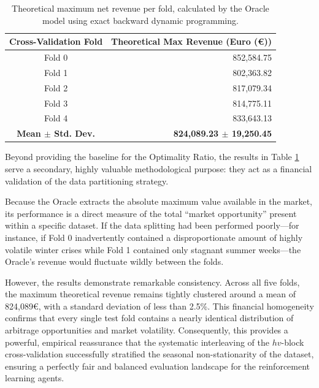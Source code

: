                 \begin{table}[h]
                    \centering
                    \renewcommand{\arraystretch}{1.2} 
                    \begin{tabular}{c r}
                        \hline
                        \textbf{Cross-Validation Fold} & \textbf{Theoretical Max Revenue (Euro (€))} \\
                        \hline
                        Fold 0 & 852,584.75 \\
                        Fold 1 & 802,363.82 \\
                        Fold 2 & 817,079.34 \\
                        Fold 3 & 814,775.11 \\
                        Fold 4 & 833,643.13 \\
                        \hline
                        \textbf{Mean $\pm$ Std. Dev.} & \textbf{824,089.23 $\pm$ 19,250.45} \\
                        \hline
                    \end{tabular}
                    \caption{Theoretical maximum net revenue per fold, calculated by the Oracle model using exact backward dynamic programming.}
                    \label{tab:oracle_results}
                \end{table}
                
                Beyond providing the baseline for the Optimality Ratio, the results in Table \ref{tab:oracle_results} serve a secondary, highly valuable methodological purpose: they act as a financial validation of the data partitioning strategy. 
                
                Because the Oracle extracts the absolute maximum value available in the market, its performance is a direct measure of the total ``market opportunity'' present within a specific dataset. If the data splitting had been performed poorly—for instance, if Fold 0 inadvertently contained a disproportionate amount of highly volatile winter crises while Fold 1 contained only stagnant summer weeks—the Oracle's revenue would fluctuate wildly between the folds. 
                
                However, the results demonstrate remarkable consistency. Across all five folds, the maximum theoretical revenue remains tightly clustered around a mean of 824,089€, with a standard deviation of less than 2.5\%. This financial homogeneity confirms that every single test fold contains a nearly identical distribution of arbitrage opportunities and market volatility. Consequently, this provides a powerful, empirical reassurance that the systematic interleaving of the $hv$-block cross-validation successfully stratified the seasonal non-stationarity of the dataset, ensuring a perfectly fair and balanced evaluation landscape for the reinforcement learning agents.
                            

